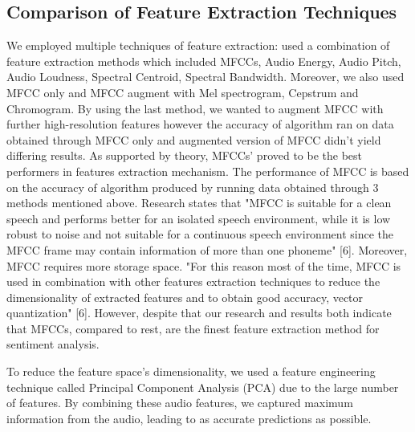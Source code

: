 \documentclass[conference]{IEEEtran}
\begin{document}
\subsection{Comparison of Feature Extraction Techniques}
We employed multiple techniques of feature extraction: used a combination of feature extraction methods which included MFCCs, Audio Energy, Audio Pitch, Audio Loudness, Spectral Centroid, Spectral Bandwidth. Moreover, we also used MFCC only and MFCC augment with Mel spectrogram, Cepstrum and Chromogram. By using the last method, we wanted to augment MFCC with further high-resolution features however the accuracy of algorithm ran on data obtained through MFCC only and augmented version of MFCC didn’t yield differing results. As supported by theory, MFCCs’ proved to be the best performers in features extraction mechanism. The performance of MFCC is based on the accuracy of algorithm produced by running data obtained through 3 methods mentioned above.
Research states that "MFCC is suitable for a clean speech and performs better for an isolated speech environment, while it is low robust to noise and not suitable for a continuous speech environment since the MFCC frame may contain information of more than one phoneme" [6]. Moreover, MFCC requires more storage space. "For this reason most of the time, MFCC is used in combination with other features extraction techniques to reduce the dimensionality of extracted features and to obtain good accuracy, vector quantization" [6]. However, despite that our research and results both indicate that MFCCs, compared to rest, are the finest feature extraction method for sentiment analysis.

To reduce the feature space’s dimensionality, we used a feature engineering technique called Principal Component Analysis (PCA) due to the large number of features. By combining these audio features, we captured maximum information from the audio, leading to as accurate predictions as possible.
\end{document}
